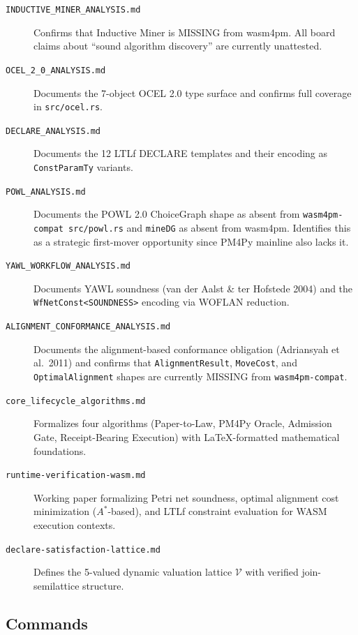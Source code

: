 \begin{description}
  \item[\texttt{INDUCTIVE\_MINER\_ANALYSIS.md}] Confirms that Inductive Miner
    is MISSING from wasm4pm. All board claims about ``sound algorithm
    discovery'' are currently unattested.

  \item[\texttt{OCEL\_2\_0\_ANALYSIS.md}] Documents the 7-object OCEL 2.0
    type surface and confirms full coverage in \texttt{src/ocel.rs}.

  \item[\texttt{DECLARE\_ANALYSIS.md}] Documents the 12 LTLf DECLARE
    templates and their encoding as \texttt{ConstParamTy} variants.

  \item[\texttt{POWL\_ANALYSIS.md}] Documents the POWL 2.0 ChoiceGraph shape
    as absent from \texttt{wasm4pm-compat src/powl.rs} and \texttt{mineDG}
    as absent from wasm4pm. Identifies this as a strategic first-mover
    opportunity since PM4Py mainline also lacks it.

  \item[\texttt{YAWL\_WORKFLOW\_ANALYSIS.md}] Documents YAWL soundness
    (van der Aalst \& ter Hofstede 2004) and the \texttt{WfNetConst<SOUNDNESS>}
    encoding via WOFLAN reduction.

  \item[\texttt{ALIGNMENT\_CONFORMANCE\_ANALYSIS.md}] Documents the
    alignment-based conformance obligation (Adriansyah et al.\ 2011) and
    confirms that \texttt{AlignmentResult}, \texttt{MoveCost}, and
    \texttt{OptimalAlignment} shapes are currently MISSING from
    \texttt{wasm4pm-compat}.

  \item[\texttt{core\_lifecycle\_algorithms.md}] Formalizes four algorithms
    (Paper-to-Law, PM4Py Oracle, Admission Gate, Receipt-Bearing Execution)
    with LaTeX-formatted mathematical foundations.

  \item[\texttt{runtime-verification-wasm.md}] Working paper formalizing Petri
    net soundness, optimal alignment cost minimization ($A^*$-based), and LTLf
    constraint evaluation for WASM execution contexts.

  \item[\texttt{declare-satisfaction-lattice.md}] Defines the 5-valued dynamic
    valuation lattice $\mathcal{V}$ with verified join-semilattice structure.
\end{description}

\subsection{Commands}
\label{sec:sources-papers-impl-commands}

